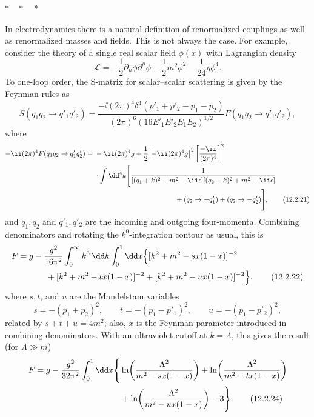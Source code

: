 \begin{center}
  $*\quad *\quad *$
\end{center}

In electrodynamics there is a natural definition of renormalized couplings
as well as renormalized masses and fields. This is not always the case. For
example, consider the theory of a single real scalar field $\phi(x)$ with
Lagrangian density
\begin{equation}
  \mathcal{L}=-\frac12\partial_\mu\phi\partial^\mu\phi
  -\frac12m^2\phi^2-\frac1{24}g\phi^4.
  \tag{12.2.19}\label{eq:12.2.19}
\end{equation}
To one-loop order, the S-matrix for scalar--scalar scattering is given by the
Feynman rules as
\begin{equation}
  S(q_1q_2\to q'_1q'_2)
  =\frac{-\ii(2\pi)^4\delta^4(p'_1+p'_2-p_1-p_2)}
  {(2\pi)^6(16E'_1E'_2E_1E_2)^{1/2}}
  F(q_1q_2\to q'_1q'_2),
  \tag{12.2.20}\label{eq:12.2.20}
\end{equation}
where
\begin{align}
 -\ii(2\pi)^4F(q_1q_2\to q'_1q'_2)
 ={}&-\ii(2\pi)^4g
 +\frac12\bigl[-\ii(2\pi)^4g\bigr]^2
 \left[\frac{-\ii}{(2\pi)^4}\right]^2
 \notag\\
 &\cdot\int \dd^4k\Biggl[
 \frac{1}{[(q_1+k)^2+m^2-\ii\epsilon][(q_2-k)^2+m^2-\ii\epsilon]}
 \notag\\
 &\hspace{4.0cm}+(q_2\to-q'_1)+(q_2\to-q'_2)\Biggr],
 \tag{12.2.21}\label{eq:12.2.21}
\end{align}
and $q_1,q_2$ and $q'_1,q'_2$ are the incoming and outgoing four-momenta.
Combining denominators and rotating the $k^0$-integration contour as usual,
this is
\begin{align}
 F={}&g-\frac{g^2}{16\pi^2}\int_0^\infty k^3\,\dd k\int_0^1\dd x
 \Bigl\{[k^2+m^2-sx(1-x)]^{-2}
 \notag\\
 &\qquad+[k^2+m^2-tx(1-x)]^{-2}
       +[k^2+m^2-ux(1-x)]^{-2}\Bigr\},
 \tag{12.2.22}\label{eq:12.2.22}
\end{align}
where $s,t$, and $u$ are the Mandelstam variables
\begin{equation}
  s=-(p_1+p_2)^2,\qquad
  t=-(p_1-p'_1)^2,\qquad
  u=-(p_1-p'_2)^2,
  \tag{12.2.23}\label{eq:12.2.23}
\end{equation}
related by $s+t+u=4m^2$; also, $x$ is the Feynman parameter introduced in
combining denominators. With an ultraviolet cutoff at $k=\Lambda$, this gives
the result (for $\Lambda\gg m$)
\begin{align}
 F=g-\frac{g^2}{32\pi^2}\int_0^1\dd x\Biggl\{
 &\ln\!\left(\frac{\Lambda^2}{m^2-sx(1-x)}\right)
 +\ln\!\left(\frac{\Lambda^2}{m^2-tx(1-x)}\right)
 \notag\\
 &+\ln\!\left(\frac{\Lambda^2}{m^2-ux(1-x)}\right)-3\Biggr\}.
 \tag{12.2.24}\label{eq:12.2.24}
\end{align}
